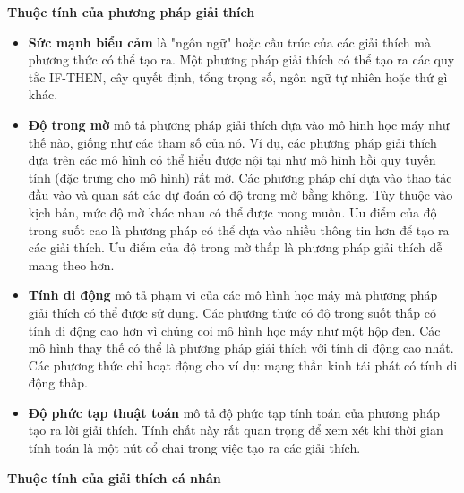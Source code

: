 \textbf{Thuộc tính của phương pháp giải thích}
\begin{itemize}
    \item \textbf{Sức mạnh biểu cảm} là "ngôn ngữ" hoặc cấu trúc của các giải thích mà phương thức có thể tạo ra. Một phương pháp giải thích có thể tạo ra các quy tắc IF-THEN, cây quyết định, tổng trọng số, ngôn ngữ tự nhiên hoặc thứ gì khác.
    \item \textbf{Độ trong mờ} mô tả phương pháp giải thích dựa vào mô hình học máy như thế nào, giống như các tham số của nó. Ví dụ, các phương pháp giải thích dựa trên các mô hình có thể hiểu được nội tại như mô hình hồi quy tuyến tính (đặc trưng cho mô hình) rất mờ. Các phương pháp chỉ dựa vào thao tác đầu vào và quan sát các dự đoán có độ trong mờ bằng không. Tùy thuộc vào kịch bản, mức độ mờ khác nhau có thể được mong muốn. Ưu điểm của độ trong suốt cao là phương pháp có thể dựa vào nhiều thông tin hơn để tạo ra các giải thích. Ưu điểm của độ trong mờ thấp là phương pháp giải thích dễ mang theo hơn.
    \item \textbf{Tính di động} mô tả phạm vi của các mô hình học máy mà phương pháp giải thích có thể được sử dụng. Các phương thức có độ trong suốt thấp có tính di động cao hơn vì chúng coi mô hình học máy như một hộp đen. Các mô hình thay thế có thể là phương pháp giải thích với tính di động cao nhất. Các phương thức chỉ hoạt động cho ví dụ: mạng thần kinh tái phát có tính di động thấp.

    \item \textbf{Độ phức tạp thuật toán} mô tả độ phức tạp tính toán của phương pháp tạo ra lời giải thích. Tính chất này rất quan trọng để xem xét khi thời gian tính toán là một nút cổ chai trong việc tạo ra các giải thích.


\end{itemize}

\textbf{Thuộc tính của giải thích cá nhân}

